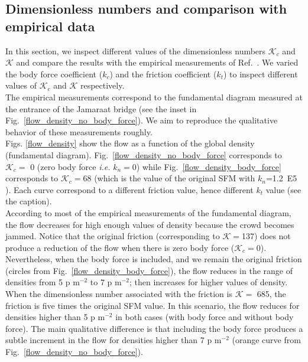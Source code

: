 \documentclass[preprint,12pt]{elsarticle}
\begin{document}
\subsection{Dimensionless numbers and comparison with empirical data}


In this section, we inspect different values of the dimensionless numbers $\mathcal{K}_c$ and $\mathcal{K}$ and compare the results with the empirical measurements of Ref.~\cite{helbing_2007}. We varied the body force coefficient ($k_c$) and the friction coefficient ($k_t$) to inspect different values of $\mathcal{K}_c$ and $\mathcal{K}$ respectively.\\

The empirical measurements correspond to the fundamental diagram measured at the entrance of the Jamaraat bridge (see the inset in Fig.~\ref{flow_density_no_body_force}). We aim to reproduce the qualitative behavior of these measurements roughly.\\

Figs. \ref{flow_density} show the flow as a function of the global density (fundamental diagram). Fig.~\ref{flow_density_no_body_force} corresponds to $\mathcal{K}_c=$ 0 (zero body force \textit{i.e.} $k_n=0$) while Fig.~\ref{flow_density_body_force} corresponds to $\mathcal{K}_c=$68 (which is the value of the original SFM with $k_n$=1.2~E5 ). Each curve correspond to a different friction value, hence different $k_t$ value (see the caption).\\

According to most of the empirical measurements of the fundamental diagram, the flow decreases for high enough values of density because the crowd becomes jammed. Notice that the original friction (corresponding to $\mathcal{K}=$137) does not produce a reduction of the flow when there is zero body force ($\mathcal{K}_c=$0). Nevertheless, when the body force is included, and we remain the original friction (circles from Fig.~\ref{flow_density_body_force}), the flow reduces in the range of densities from  5 p m$^{-2}$ to 7 p m$^{-2}$; then increases for higher values of density.\\

When the dimensionless number associated with the friction is $\mathcal{K} = $ 685, the friction is five times the original SFM value. In this scenario, the flow reduces for densities higher than 5 p m$^{-2}$ in both cases (with body force and without body force). The main qualitative difference is that including the body force produces a subtle increment in the flow for densities higher than 7 p m$^{-2}$ (orange curve from Fig.~\ref{flow_density_no_body_force}). \\
\end{document}
